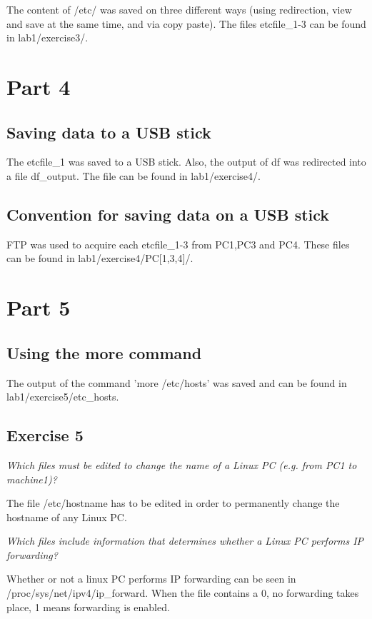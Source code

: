 \documentclass[a4paper, 11pt]{article}
\begin{document}
The content of /etc/ was saved on three different ways (using redirection, view and save at the same time, and via copy paste).
The files etcfile\_1-3 can be found in lab1/exercise3/.

\section{Part 4}

\subsection {Saving data to a USB stick}

The etcfile\_1 was saved to a USB stick. Also, the output of df was redirected into a file df\_output. The file can be
found in lab1/exercise4/.

\subsection {Convention for saving data on a USB stick}

FTP was used to acquire each etcfile\_1-3 from PC1,PC3 and PC4. These files can be found in lab1/exercise4/PC[1,3,4]/.

\section{Part 5}

\subsection{Using the more command}

The output of the command 'more /etc/hosts' was saved and can be found in lab1/exercise5/etc\_hosts.

\subsection{Exercise 5}

\emph{Which files must be edited to change the name of a Linux PC (e.g. from PC1 to machine1)?}

The file /etc/hostname has to be edited in order to permanently change the hostname of any Linux PC.

\emph{Which files include information that determines whether a Linux PC performs IP forwarding?}

Whether or not a linux PC performs IP forwarding can be seen in /proc/sys/net/ipv4/ip\_forward. When the file contains a 0,
no forwarding takes place, 1 means forwarding is enabled.
\end{document}
